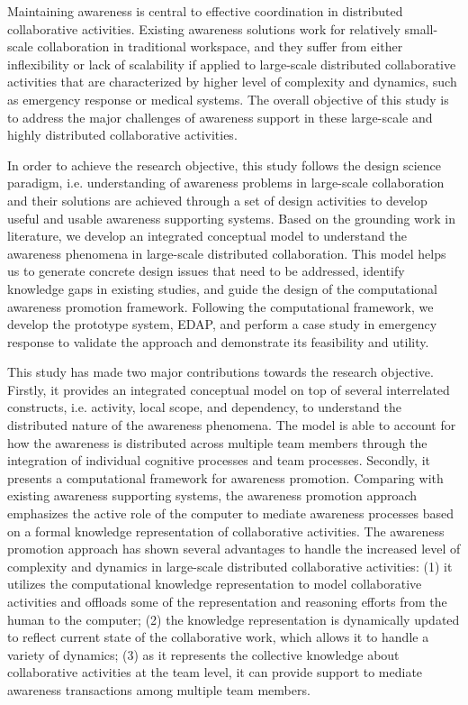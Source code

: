 Maintaining awareness is central to effective coordination in distributed collaborative activities. Existing awareness solutions work for relatively small-scale collaboration in traditional workspace, and they suffer from either inflexibility or lack of scalability if applied to large-scale distributed collaborative activities that are characterized by higher level of complexity and dynamics, such as emergency response or medical systems. The overall objective of this study is to address the major challenges of awareness support in these large-scale and highly distributed collaborative activities.

In order to achieve the research objective, this study follows the design science paradigm, i.e. understanding of awareness problems in large-scale collaboration and their solutions are achieved through a set of design activities to develop useful and usable awareness supporting systems. Based on the grounding work in literature, we develop an integrated conceptual model to understand the awareness phenomena in large-scale distributed collaboration. This model helps us to generate concrete design issues that need to be addressed, identify knowledge gaps in existing studies, and guide the design of the computational awareness promotion framework. Following the computational framework, we develop the prototype system, EDAP, and perform a case study in emergency response to validate the approach and demonstrate its feasibility and utility.

This study has made two major contributions towards the research objective. Firstly, it provides an integrated conceptual model on top of several interrelated constructs, i.e. activity, local scope, and dependency, to understand the distributed nature of the awareness phenomena. The model is able to account for how the awareness is distributed across multiple team members through the integration of individual cognitive processes and team processes. Secondly, it presents a computational framework for awareness promotion. Comparing with existing awareness supporting systems, the awareness promotion approach emphasizes the active role of the computer to mediate awareness processes based on a formal knowledge representation of collaborative activities. The awareness promotion approach has shown several advantages to handle the increased level of complexity and dynamics in large-scale distributed collaborative activities: (1) it utilizes the computational knowledge representation to model collaborative activities and offloads some of the representation and reasoning efforts from the human to the computer; (2) the knowledge representation is dynamically updated to reflect current state of the collaborative work, which allows it to handle a variety of dynamics; (3) as it represents the collective knowledge about collaborative activities at the team level, it can provide support to mediate awareness transactions among multiple team members.